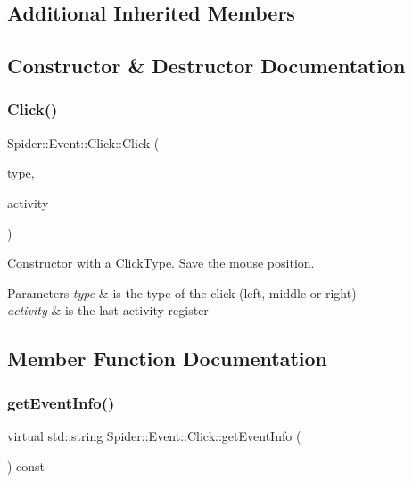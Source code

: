 \subsection*{Additional Inherited Members}


\subsection{Constructor \& Destructor Documentation}
\mbox{\label{class_spider_1_1_event_1_1_click_a81c8bc490c33205c434b0c2e8db4b6f5}} 
\subsubsection{\texorpdfstring{Click()}{Click()}}
{\footnotesize\ttfamily Spider\+::\+Event\+::\+Click\+::\+Click (\begin{DoxyParamCaption}\item[{\hyperlink{namespace_spider_1_1_event_ae178d39ebb8937d04ffe6ead8f306fd0}{Click\+Type}}]{type,  }\item[{const std\+::string \&}]{activity }\end{DoxyParamCaption})}



Constructor with a Click\+Type. Save the mouse position. 


\begin{DoxyParams}{Parameters}
{\em type} & is the type of the click (left, middle or right) \\
\hline
{\em activity} & is the last activity register \\
\hline
\end{DoxyParams}


\subsection{Member Function Documentation}
\mbox{\label{class_spider_1_1_event_1_1_click_a916e746dc2145859f697de4d9f64cd00}} 
\subsubsection{\texorpdfstring{get\+Event\+Info()}{getEventInfo()}}
{\footnotesize\ttfamily virtual std\+::string Spider\+::\+Event\+::\+Click\+::get\+Event\+Info (\begin{DoxyParamCaption}{ }\end{DoxyParamCaption}) const\hspace{0.3cm}{\ttfamily [virtual]}}



